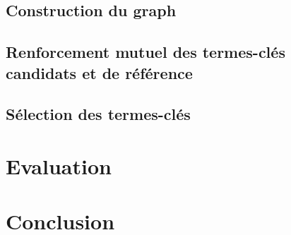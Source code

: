       \subsection{Construction du graph}
      \label{sec:main-automatic_keyphrase_annotation-supervised_automatic_keyphrase_extraction-topicrank++-graph_construction}

      \subsection{Renforcement mutuel des termes-clés candidats et de référence}
      \label{sec:main-automatic_keyphrase_annotation-supervised_automatic_keyphrase_extraction-topicrank++-mutual_reinforcement}

      \subsection{Sélection des termes-clés}
      \label{sec:main-automatic_keyphrase_annotation-supervised_automatic_keyphrase_extraction-topicrank++-keyphrase_selection}

    \section{Evaluation}
    \label{sec:main-automatic_keyphrase_annotation-supervised_automatic_keyphrase_annotation-evaluation}

    \section{Conclusion}
    \label{sec:main-automatic_keyphrase_annotation-supervised_automatic_keyphrase_annotation-conclusion}


